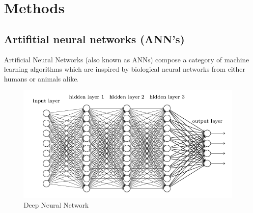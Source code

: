 \documentclass[journal,compsoc]{IEEEtran}
\begin{document}


\section{Methods}
\subsection{Artifitial neural networks (ANN's)}
Artificial Neural Networks (also known as ANNs) compose a category of machine learning algorithms which are inspired by biological neural networks from either humans or animals alike.
\begin{figure}[h]
  \centering
    \includegraphics[scale=0.5, width=\linewidth]{figures/Deep_Learning.png}
  \caption{Deep Neural Network}
\end{figure}
\end{document}
